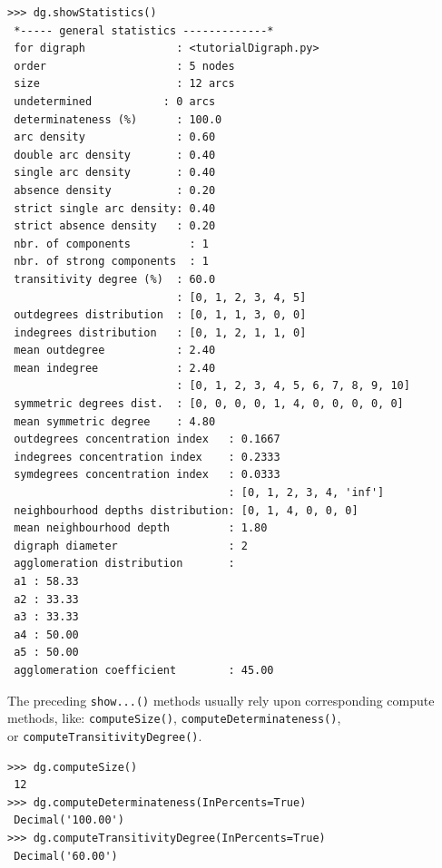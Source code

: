 \begin{lstlisting}[caption={Inspecting a \texttt{Digraph} object},label=list:1.5]
>>> dg.showStatistics()
 *----- general statistics -------------*
 for digraph              : <tutorialDigraph.py>
 order                    : 5 nodes
 size                     : 12 arcs
 undetermined           : 0 arcs
 determinateness (%)      : 100.0
 arc density              : 0.60
 double arc density       : 0.40
 single arc density       : 0.40
 absence density          : 0.20
 strict single arc density: 0.40
 strict absence density   : 0.20
 nbr. of components         : 1
 nbr. of strong components  : 1
 transitivity degree (%)  : 60.0
                          : [0, 1, 2, 3, 4, 5]
 outdegrees distribution  : [0, 1, 1, 3, 0, 0]
 indegrees distribution   : [0, 1, 2, 1, 1, 0]
 mean outdegree           : 2.40
 mean indegree            : 2.40
                          : [0, 1, 2, 3, 4, 5, 6, 7, 8, 9, 10]
 symmetric degrees dist.  : [0, 0, 0, 0, 1, 4, 0, 0, 0, 0, 0]
 mean symmetric degree    : 4.80
 outdegrees concentration index   : 0.1667
 indegrees concentration index    : 0.2333
 symdegrees concentration index   : 0.0333
                                  : [0, 1, 2, 3, 4, 'inf']
 neighbourhood depths distribution: [0, 1, 4, 0, 0, 0]
 mean neighbourhood depth         : 1.80
 digraph diameter                 : 2
 agglomeration distribution       :
 a1 : 58.33
 a2 : 33.33
 a3 : 33.33
 a4 : 50.00
 a5 : 50.00
 agglomeration coefficient        : 45.00
\end{lstlisting}

The preceding \texttt{show...()} methods usually rely upon corresponding compute methods, like: \texttt{computeSize()}, \texttt{computeDeterminateness()},\\ or \texttt{computeTransitivityDegree()}.
\begin{lstlisting}[caption={Various \texttt{compute...()} methods.},label=list:1.6]
>>> dg.computeSize()
 12
>>> dg.computeDeterminateness(InPercents=True)
 Decimal('100.00')
>>> dg.computeTransitivityDegree(InPercents=True)
 Decimal('60.00')
\end{lstlisting}

